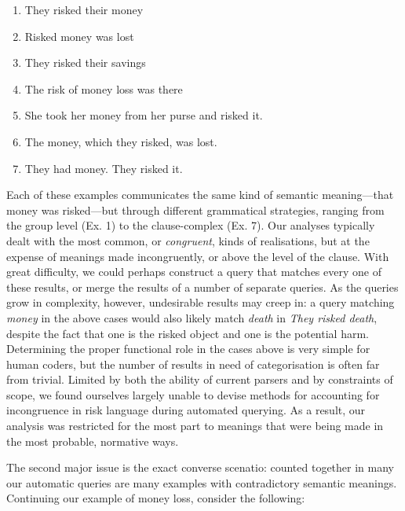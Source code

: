         \begin{enumerate} [before=\itshape,font=\normalfont] \setlength\itemsep{0em} \small
            \item They risked their money
            \item Risked money was lost
            \item They risked their savings
            \item The risk of money loss was there
            \item She took her money from her purse and risked it.
            \item The money, which they risked, was lost.
            \item They had money. They risked it.
        \end{enumerate}
        Each of these examples communicates the same kind of semantic meaning---that money was risked---but through different grammatical strategies, ranging from the group level (Ex. 1) to the clause-complex (Ex. 7). Our analyses typically dealt with the most common, or \emph{congruent}, kinds of realisations, but at the expense of meanings made incongruently, or above the level of the clause. With great difficulty, we could perhaps construct a query that matches every one of these results, or merge the results of a number of separate queries. As the queries grow in complexity, however, undesirable results may creep in: a query matching \emph{money} in the above cases would also likely match \emph{death} in \emph{They risked death}, despite the fact that one is the risked object and one is the potential harm. Determining the proper functional role in the cases above is very simple for human coders, but the number of results in need of categorisation is often far from trivial. Limited by both the ability of current parsers and by constraints of scope, we found ourselves largely unable to devise methods for accounting for incongruence in risk language during automated querying. As a result, our analysis was restricted for the most part to meanings that were being made in the most probable, normative ways.

        The second major issue is the exact converse scenatio: counted together in many our automatic queries are many examples with contradictory semantic meanings. Continuing our example of money loss, consider the following:

